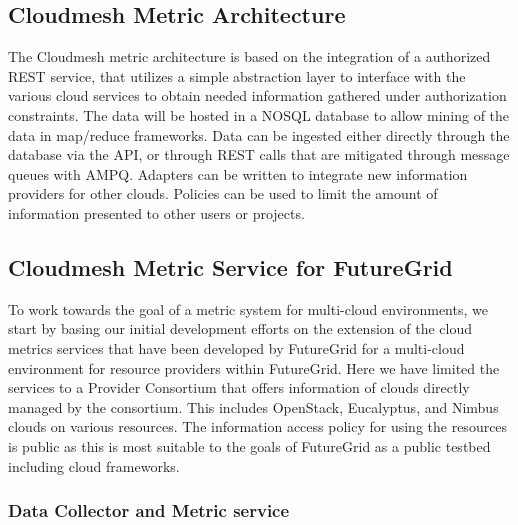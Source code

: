 \documentclass{tex/sig-alternate}
\begin{document}
{\subsection{Cloudmesh Metric Architecture}

The Cloudmesh metric architecture is based on the integration of a
authorized REST service, that utilizes a simple abstraction layer to interface
with the various cloud services to obtain needed information gathered
under authorization constraints. The data will be hosted in a NOSQL
database to allow mining of the data in map/reduce frameworks. Data
can be ingested either directly through the database via the API, or
through REST calls that are mitigated through message queues with
AMPQ. Adapters can be written to integrate new information providers
for other clouds. Policies can be used to limit the amount of
information presented to other users or projects.

\subsection{Cloudmesh Metric Service for FutureGrid}

To work towards the goal of a metric system for multi-cloud
environments, we start by basing our initial
development efforts on the extension of the cloud metrics services
that have been developed by FutureGrid for a multi-cloud environment
for resource providers within FutureGrid. Here we have limited the
services to a Provider Consortium that offers information of clouds
directly managed by the consortium. This includes OpenStack,
Eucalyptus, and Nimbus clouds on various resources. The information
access policy for using the resources is public as this is most
suitable to the goals of FutureGrid as a public testbed including
cloud frameworks. 

\subsubsection{Data Collector and Metric service}


}
\end{document}
